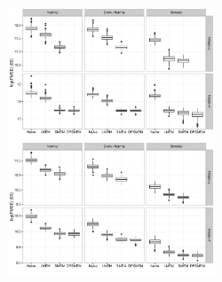 \documentclass[handout]{beamer}\usepackage[]{graphicx}\usepackage[]{color}
\begin{document}
\begin{frame}

\begin{figure}
\centering
\includegraphics[height=8cm,width=10cm]{pmse}
\end{figure}

% 
% 
% 
% 
% 
% 


\end{frame}
\end{document}
